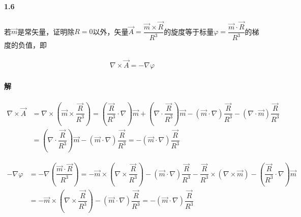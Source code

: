 \documentclass{article}
\begin{document}
\paragraph{1.6}

若$\vec{m}$是常矢量，证明除$R=0$以外，矢量$\vec{A} = \dfrac{\vec{m} \times \vec{R}}{R^3} $的旋度等于标量$\varphi = \dfrac{\vec{m} \cdot \vec{R}}{R^3} $的梯度的负值，即

\begin{equation*}
  \begin{aligned}
    \nabla \times \vec{A} = - \nabla \varphi
  \end{aligned}
\end{equation*}

\paragraph{解}

\begin{equation*}
  \begin{aligned}
    \nabla \times \vec{A} &= \nabla \times \left( \vec{m} \times \dfrac{\vec{R}}{R^3}  \right) = \left( \dfrac{\vec{R}}{R^3} \cdot \nabla  \right) \vec{m} + \left( \nabla \cdot \dfrac{\vec{R}}{R^3}  \right) \vec{m} - \left( \vec{m} \cdot \nabla \right)\dfrac{\vec{R}}{R^3} - \left( \nabla \cdot \vec{m} \right) \dfrac{\vec{R}}{R^3} \\
    &= \left( \nabla \cdot \dfrac{\vec{R}}{R^3}  \right) \vec{m} - \left( \vec{m} \cdot \nabla \right) \dfrac{\vec{R}}{R^3} = - \left( \vec{m} \cdot \nabla \right) \dfrac{\vec{R}}{R^3}  
  \end{aligned}
\end{equation*}

\begin{equation*}
  \begin{aligned}
    - \nabla \varphi &= - \nabla \left( \dfrac{\vec{m} \cdot \vec{R}}{R^3}  \right) = - \vec{m} \times \left( \nabla \times \dfrac{\vec{R}}{R^3}  \right) - \left( \vec{m} \cdot \nabla \right) \dfrac{\vec{R}}{R^3} - \dfrac{\vec{R}}{R^3} \times \left( \nabla \times \vec{m} \right) - \left( \dfrac{\vec{R}}{R^3} \cdot \nabla  \right) \vec{m} \\
    &= - \vec{m} \times \left( \nabla \times \dfrac{\vec{R}}{R^3}  \right) - \left( \vec{m} \cdot \nabla \right) \dfrac{\vec{R}}{R^3} = - \left( \vec{m} \cdot \nabla \right) \dfrac{\vec{R}}{R^3}  
  \end{aligned}
\end{equation*}
\end{document}
